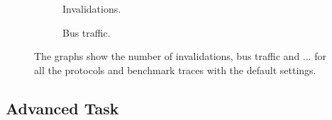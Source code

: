 \begin{figure}[ht]
    \centering
    \begin{subfigure}[b]{0.33\textwidth}
        \centering
        \caption{Invalidations.}
        \label{fig:invalidations}
    \end{subfigure}%
    \hfill
    \begin{subfigure}[b]{0.33\textwidth}
        \centering
        \caption{Bus traffic.}
        \label{fig:bus_traffic}
    \end{subfigure}%
    \hfill
    \begin{subfigure}[b]{0.33\textwidth}
        \centering
        \caption{}
        \label{fig:}
    \end{subfigure}
    \hfill
    \caption{The graphs show the number of invalidations, bus traffic and ... for all the protocols and benchmark traces with the default settings.}
    \label{fig:}
\end{figure}

\subsection{Advanced Task}\label{results:advanced}
